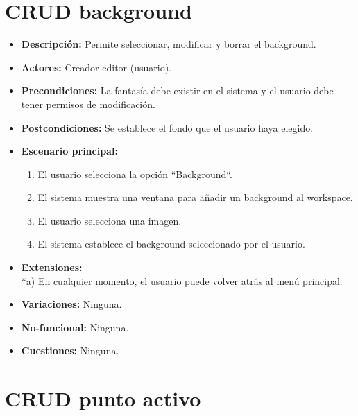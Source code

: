 \section{CRUD background}
\begin{itemize}
	\item \textbf{Descripción:} Permite seleccionar, modificar y borrar el background.
	\item \textbf{Actores:} Creador-editor (usuario).
	\item \textbf{Precondiciones:} La fantasía debe existir en el sistema y el usuario debe tener permisos de modificación.
	\item \textbf{Postcondiciones:} Se establece el fondo que el usuario haya elegido.
	\item \textbf{Escenario principal:}
	\begin{enumerate}
		\item El usuario selecciona la opción ``Background``.
		\item El sistema muestra una ventana para añadir un background al workspace.
		\item El usuario selecciona una imagen. %
		\item El sistema establece el background seleccionado por el usuario.
	\end{enumerate}
	\item \textbf{Extensiones:} \\ *a) En cualquier momento, el usuario puede volver atrás al menú principal. 
	\item \textbf{Variaciones:} Ninguna.
	\item \textbf{No-funcional:} Ninguna.
	\item \textbf{Cuestiones:} Ninguna.
\end{itemize}


\section{CRUD punto activo}
